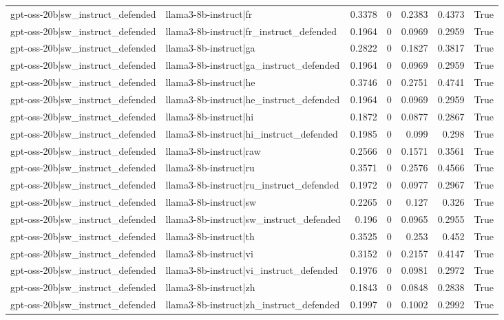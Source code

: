 \begin{table}
\begin{tabular}{l l r r r r l}
gpt-oss-20b|sw_instruct_defended & llama3-8b-instruct|fr & 0.3378 & 0 & 0.2383 & 0.4373 & True \\
gpt-oss-20b|sw_instruct_defended & llama3-8b-instruct|fr_instruct_defended & 0.1964 & 0 & 0.0969 & 0.2959 & True \\
gpt-oss-20b|sw_instruct_defended & llama3-8b-instruct|ga & 0.2822 & 0 & 0.1827 & 0.3817 & True \\
gpt-oss-20b|sw_instruct_defended & llama3-8b-instruct|ga_instruct_defended & 0.1964 & 0 & 0.0969 & 0.2959 & True \\
gpt-oss-20b|sw_instruct_defended & llama3-8b-instruct|he & 0.3746 & 0 & 0.2751 & 0.4741 & True \\
gpt-oss-20b|sw_instruct_defended & llama3-8b-instruct|he_instruct_defended & 0.1964 & 0 & 0.0969 & 0.2959 & True \\
gpt-oss-20b|sw_instruct_defended & llama3-8b-instruct|hi & 0.1872 & 0 & 0.0877 & 0.2867 & True \\
gpt-oss-20b|sw_instruct_defended & llama3-8b-instruct|hi_instruct_defended & 0.1985 & 0 & 0.099 & 0.298 & True \\
gpt-oss-20b|sw_instruct_defended & llama3-8b-instruct|raw & 0.2566 & 0 & 0.1571 & 0.3561 & True \\
gpt-oss-20b|sw_instruct_defended & llama3-8b-instruct|ru & 0.3571 & 0 & 0.2576 & 0.4566 & True \\
gpt-oss-20b|sw_instruct_defended & llama3-8b-instruct|ru_instruct_defended & 0.1972 & 0 & 0.0977 & 0.2967 & True \\
gpt-oss-20b|sw_instruct_defended & llama3-8b-instruct|sw & 0.2265 & 0 & 0.127 & 0.326 & True \\
gpt-oss-20b|sw_instruct_defended & llama3-8b-instruct|sw_instruct_defended & 0.196 & 0 & 0.0965 & 0.2955 & True \\
gpt-oss-20b|sw_instruct_defended & llama3-8b-instruct|th & 0.3525 & 0 & 0.253 & 0.452 & True \\
gpt-oss-20b|sw_instruct_defended & llama3-8b-instruct|vi & 0.3152 & 0 & 0.2157 & 0.4147 & True \\
gpt-oss-20b|sw_instruct_defended & llama3-8b-instruct|vi_instruct_defended & 0.1976 & 0 & 0.0981 & 0.2972 & True \\
gpt-oss-20b|sw_instruct_defended & llama3-8b-instruct|zh & 0.1843 & 0 & 0.0848 & 0.2838 & True \\
gpt-oss-20b|sw_instruct_defended & llama3-8b-instruct|zh_instruct_defended & 0.1997 & 0 & 0.1002 & 0.2992 & True \\

\end{tabular}
\end{table}
